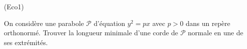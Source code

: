 \begin{tiny}(Eco1)\end{tiny} On considère une parabole $\mathcal P$ d'équation $y^2=px$ avec $p>0$ dans un repère orthonormé. Trouver la longueur minimale d'une corde de $\mathcal P$ normale en une de ses extrémités.